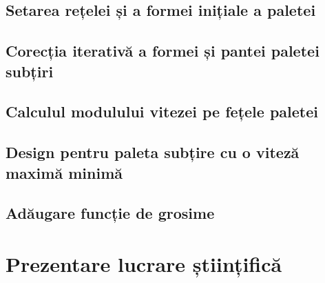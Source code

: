 

\clearpage


\subsection{Setarea rețelei și a formei inițiale a paletei}



\clearpage


\subsection{Corecția iterativă a formei și pantei paletei subțiri}



\clearpage


\subsection{Calculul modulului vitezei pe fețele paletei}



\clearpage

\subsection{Design pentru paleta subțire cu o viteză maximă minimă}



\clearpage


\subsection{Adăugare funcție de grosime}



\clearpage


\section{Prezentare lucrare științifică}



\clearpage